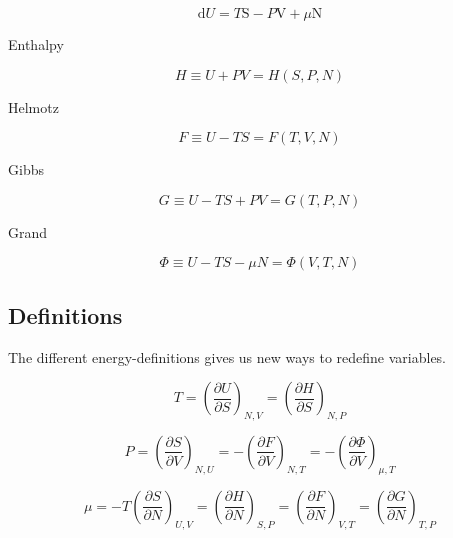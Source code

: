 \documentclass[reprint,english,notitlepage]{revtex4-1}  %
\begin{document}
\begin{equation}
\mathrm{d} U = T \mathrm{S} - P\mathrm{V} + \mu \mathrm{N}
\end{equation}

\begin{center}
Enthalpy
\end{center}

\begin{equation}
 H \equiv U + PV = H(S, P, N)
\end{equation}


\begin{center}
Helmotz
\end{center}

\begin{equation}
 F \equiv U -TS = F(T, V, N)
\end{equation}


\begin{center}
Gibbs
\end{center}

\begin{equation}
 G \equiv U -TS + PV = G(T, P, N)
\end{equation}


\begin{center}
Grand
\end{center}

\begin{equation}
 \Phi \equiv U -TS - \mu N = \Phi (V, T, N)
\end{equation}

\subsection*{Definitions}

The different energy-definitions gives us new ways to redefine variables.

\begin{equation}\label{T}
T = \left ( \frac{\partial U}{\partial S} \right )_{N,V} = \left ( \frac{\partial H}{\partial S} \right )_{N, P}
\end{equation}

\begin{equation}\label{P}
P = \left ( \frac{\partial S}{\partial V} \right )_{N, U} = -\left ( \frac{\partial F}{\partial V} \right )_{N, T} = -\left ( \frac{\partial \Phi}{\partial V} \right )_{\mu, T}
\end{equation}

\begin{equation}\label{mu}
\mu = - T \left ( \frac{\partial S}{\partial N} \right )_{U, V} = \left ( \frac{\partial H}{\partial N} \right )_{S, P} = \left ( \frac{\partial F}{\partial N} \right )_{V, T} = \left ( \frac{\partial G}{\partial N} \right )_{T, P}
\end{equation}
\end{document}
